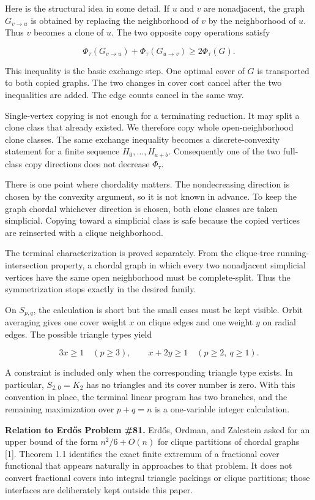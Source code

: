 \documentclass[
  11pt,
]{article}
\begin{document}
Here is the structural idea in some detail. If \(u\) and \(v\) are
nonadjacent, the graph \(G_{v\to u}\) is obtained by replacing the
neighborhood of \(v\) by the neighborhood of \(u\). Thus \(v\) becomes a
clone of \(u\). The two opposite copy operations satisfy

\[
\Phi_\tau(G_{v\to u})
+
\Phi_\tau(G_{u\to v})
\ge
2\Phi_\tau(G).
\]

This inequality is the basic exchange step. One optimal cover of \(G\)
is transported to both copied graphs. The two changes in cover cost
cancel after the two inequalities are added. The edge counts cancel in
the same way.

Single-vertex copying is not enough for a terminating reduction. It may
split a clone class that already existed. We therefore copy whole
open-neighborhood clone classes. The same exchange inequality becomes a
discrete-convexity statement for a finite sequence
\(H_0,\ldots,H_{a+b}\). Consequently one of the two full-class copy
directions does not decrease \(\Phi_\tau\).

There is one point where chordality matters. The nondecreasing direction
is chosen by the convexity argument, so it is not known in advance. To
keep the graph chordal whichever direction is chosen, both clone classes
are taken simplicial. Copying toward a simplicial class is safe because
the copied vertices are reinserted with a clique neighborhood.

The terminal characterization is proved separately. From the clique-tree
running-intersection property, a chordal graph in which every two
nonadjacent simplicial vertices have the same open neighborhood must be
complete-split. Thus the symmetrization stops exactly in the desired
family.

On \(S_{p,q}\), the calculation is short but the small cases must be
kept visible. Orbit averaging gives one cover weight \(x\) on clique
edges and one weight \(y\) on radial edges. The possible triangle types
yield

\[
3x\ge1
\quad(p\ge3),
\qquad
x+2y\ge1
\quad(p\ge2,\ q\ge1).
\]

A constraint is included only when the corresponding triangle type
exists. In particular, \(S_{2,0}=K_2\) has no triangles and its cover
number is zero. With this convention in place, the terminal linear
program has two branches, and the remaining maximization over \(p+q=n\)
is a one-variable integer calculation.

\textbf{Relation to Erdős Problem \#81.} Erdős, Ordman, and Zalcstein
asked for an upper bound of the form \(n^2/6+O(n)\) for clique
partitions of chordal graphs {[}1{]}. Theorem 1.1 identifies the exact
finite extremum of a fractional cover functional that appears naturally
in approaches to that problem. It does not convert fractional covers
into integral triangle packings or clique partitions; those interfaces
are deliberately kept outside this paper.
\end{document}
